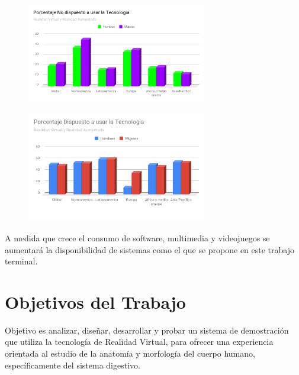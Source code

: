 \begin{figure}[H]
	\begin{center}
 		\includegraphics[width = 0.7\textwidth]{source/images/image2.png}
	\end{center} 
\end{figure}

\begin{figure}[H]
	\begin{center}
 		\includegraphics[width = 0.7\textwidth]{source/images/image10.png}
	\end{center} 
\end{figure}

A medida que crece el consumo de software, multimedia y videojuegos se aumentará la disponibilidad de sistemas como el que se propone en este trabajo terminal.
\\

\section{Objetivos del Trabajo}
Objetivo es analizar, diseñar, desarrollar y probar un sistema de demostración que utiliza la tecnología de Realidad Virtual, para ofrecer una experiencia orientada al estudio de la anatomía y morfología del cuerpo humano, específicamente del sistema digestivo.
\newline

